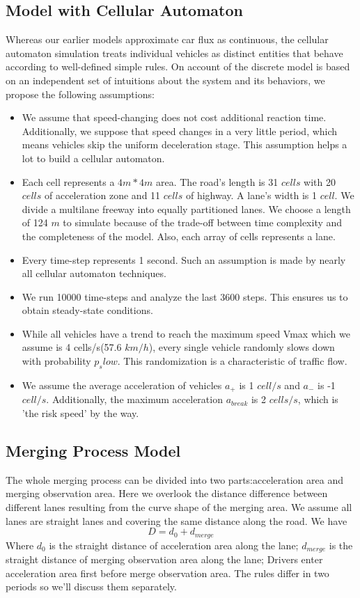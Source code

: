 \subsection{Model with Cellular Automaton}
Whereas our earlier models approximate car flux as continuous, the cellular automaton simulation treats individual vehicles as distinct entities that behave according to well-defined simple rules. On account of the discrete model is based on an independent set of intuitions about the system and its behaviors, we propose the following assumptions:
\begin{itemize}
	\item
	We assume that speed-changing does not cost additional reaction time. Additionally, we suppose that speed changes in a very little period, which means vehicles skip the uniform deceleration stage. This assumption helps a lot to build a cellular automaton.
	\item
	Each cell represents a $4m*4m$ area. The road's length is 31 $cells$ with 20 $cells$ of acceleration zone and 11 $cells$ of highway. A lane's width is 1 $cell$. We divide a multilane freeway into equally partitioned lanes. We choose a length of 124 $m$ to simulate because of the trade-off between time complexity and the completeness of the model. Also, each array of cells represents a lane.
	\item
	Every time-step represents 1 second. Such an assumption is made by nearly all cellular automaton techniques.
	\item
	We run 10000 time-steps and analyze the last 3600 steps. This ensures us to obtain steady-state conditions.
	\item
	While all vehicles have a trend to reach the maximum speed Vmax which we assume is 4 cells/s(57.6 $km/h$), every single vehicle randomly slows down with probability $p_slow$. This randomization is a characteristic of traffic flow.
	\item
	We assume the average acceleration of vehicles $a_+$ is 1 $cell/s$ and $a_-$ is -1 $cell/s$. Additionally, the maximum acceleration $a_{break}$ is 2 $cells/s$, which is 'the risk speed' by the way.
\end{itemize}

\subsection{Merging Process Model}
The whole merging process can be divided into two parts:acceleration area and merging observation area. Here we overlook the distance difference between different lanes resulting from the curve shape of the merging area. We assume all lanes are straight lanes and covering  the same distance along the road.
We have $$D=d_0+d_{merge}$$
Where $d_0$ is the straight distance of acceleration area along the lane;
   $d_{merge}$ is the straight distance of merging observation area along the lane;
Drivers enter acceleration area first before merge observation area.
The rules differ in two periods so we'll discuss them separately.

